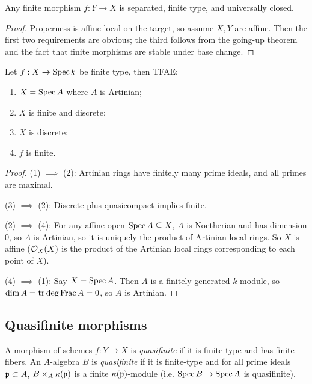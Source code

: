\documentclass[11pt]{amsart}
\begin{document}
\begin{prop}
\label{finite_implies_proper}
    Any finite morphism $f:Y\to X$ is separated, finite type, and universally closed.
\end{prop}

\begin{proof}
    Properness is affine-local on the target, so assume $X, Y$ are affine. Then the first two requirements are obvious; the third follows from the going-up theorem and the fact that finite morphisms are stable under base change.
\end{proof}

\begin{prop}
    Let $f: X\to \operatorname{Spec} k$ be finite type, then TFAE:
    \begin{enumerate}
        \item $X=\operatorname{Spec} A$ where $A$ is Artinian;
        \item $X$ is finite and discrete;
        \item $X$ is discrete;
        \item $f$ is finite.
    \end{enumerate}
\end{prop}

\begin{proof}
    (1) $\implies$ (2): Artinian rings have finitely many prime ideals, and all primes are maximal.

    (3) $\implies$ (2): Discrete plus quasicompact implies finite. 
    
    (2) $\implies$ (4): For any affine open $\operatorname{Spec} A\subseteq X$, $A$ is Noetherian and has dimension 0, so $A$ is Artinian, so it is uniquely the product of Artinian local rings. So $X$ is affine ($\mathcal{O}_X(X)$ is the product of the Artinian local rings corresponding to each point of $X$).

    (4) $\implies$ (1): Say $X = \operatorname{Spec} A$. Then $A$ is a finitely generated $k$-module, so $\dim A = \operatorname{tr\thinspace deg} \operatorname{Frac} A = 0$, so $A$ is Artinian.
\end{proof}


\subsection{Quasifinite morphisms}

\begin{defn}
    A morphism of schemes $f:Y\to X$ is \emph{quasifinite} if it is finite-type and has finite fibers. An $A$-algebra $B$ is \emph{quasifinite} if it is finite-type and for all prime ideals $\mathfrak{p}\subset A$, $B\times_A \kappa(\mathfrak{p})$ is a finite $\kappa(\mathfrak{p})$-module (i.e. $\operatorname{Spec} B\to \operatorname{Spec} A$ is quasifinite).
\end{defn}
\end{document}
